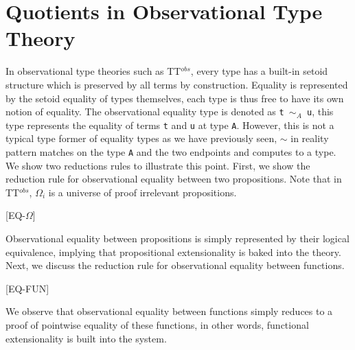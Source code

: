 \documentclass[12pt,twoside,maitrise]{dms}
\theoremstyle{definition}
\numberwithin{equation}{section}
\numberwithin{table}{chapter}
\numberwithin{figure}{chapter}
\newcommand\kw[1] {\textsf{#1}}
\newcommand\id[1] {\texttt{#1}}
\newcommand\fn[1] {\texttt{#1}}
\begin{document}
\section{Quotients in Observational Type Theory}


In observational type theories such as TT$^{obs}$\cite{pujet2022observational},
every type has a built-in setoid structure which is preserved by all terms by
construction. Equality is represented by the setoid equality of types
themselves, each type is thus free to have its own notion of equality. The
observational equality type is denoted as \fn{t $\sim_A$ u}, this type
represents the equality of terms \id{t} and \id{u} at type \id{A}. However, this
is not a typical type former of equality types as we have previously seen,
$\sim$ in reality pattern matches on the type \id{A} and the two endpoints and
computes to a type. We show two reductions rules to illustrate this point.
First, we show the reduction rule for observational equality between two
propositions. Note that in TT$^{obs}$, $\Omega_i$ is a universe of proof
irrelevant propositions.

\begin{prooftree*}

  [\kw{EQ-$\Omega$}]{}
\end{prooftree*}

Observational equality between propositions is simply represented by their
logical equivalence, implying that propositional extensionality is baked into
the theory. Next, we discuss the reduction rule for observational equality
between functions.

\begin{prooftree*}

  [\kw{EQ-FUN}]{}
\end{prooftree*}

We observe that observational equality between functions simply reduces to a
proof of pointwise equality of these functions, in other words, functional
extensionality is built into the system.
\end{document}
